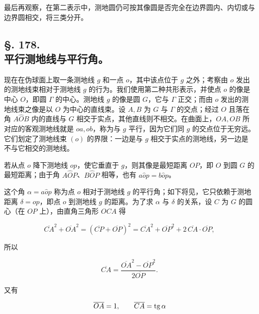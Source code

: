 最后再观察，在第二表示中，测地圆仍可按其像圆是否完全在边界圆内、内切或与边界圆相交，将三类分开。



\subsection*{§. 178.\\ 平行测地线与平行角。}



现在在伪球面上取一条测地线 \(g\) 和一点 \(o\)，其中该点位于 \(g\) 之外；考察由 \(o\) 发出的测地线束相对于测地线 \(g\) 的行为。我们使用第二种共形表示，并使点 \(o\) 的像是中心 \(O\)，即圆 \(\Gamma\) 的中心。测地线 \(g\) 的像是圆 \(G\)，它与 \(\Gamma\) 正交；而由 \(o\) 发出的测地线束之像是以 \(O\) 为中心的直线束。设 \(A,B\) 为 \(G\) 与 \(\Gamma\) 的交点；经过 \(O\) 且落在角 \(A\widehat O B\) 内的直线与 \(G\) 相交于实点，其他直线则不相交。在曲面上，\(OA,OB\) 所对应的客观测地线就是 \(oa,ob\)，称为与 \(g\) 平行，因为它们同 \(g\) 的交点位于无穷远。它们划定了测地线束 \((o)\) 的界限：一边是与 \(g\) 相交于实点的测地线，另一边是不与它相交的测地线。



\figseven

\figsevena




若从点 \(o\) 降下测地线 \(op\)，使它垂直于 \(g\)，则其像是最短距离 \(OP\)，即 \(O\) 到圆 \(G\) 的最短距离；由于角 \(A\widehat OP\)、\(B\widehat OP\) 相等，也有 \(a\widehat op=b\widehat op\)。



这个角 \(\alpha=a\widehat op\) 称为点 \(o\) 相对于测地线 \(g\) 的平行角；如下将见，它只依赖于测地距离 \(\delta=op\)，即点 \(o\) 到测地线 \(g\) 的距离。为了求 \(\alpha\) 与 \(\delta\) 的关系，设 \(C\) 为 \(G\) 的圆心（在 \(OP\) 上），由直角三角形 \(OCA\) 得

\[
 \overline{CA}^{2}+\overline{OA}^{2}=(\overline{CP}+\overline{OP})^{2}=\overline{CA}^{2}+\overline{OP}^{2}+2\,\overline{CA}\cdot\overline{OP},
\]

所以

\[
 \overline{CA}=\frac{\overline{OA}^{2}-\overline{OP}^{2}}{2\overline{OP}}.
\]

又有

\[
 \overline{OA}=1,\qquad \overline{CA}=\operatorname{tg}\alpha
\]

